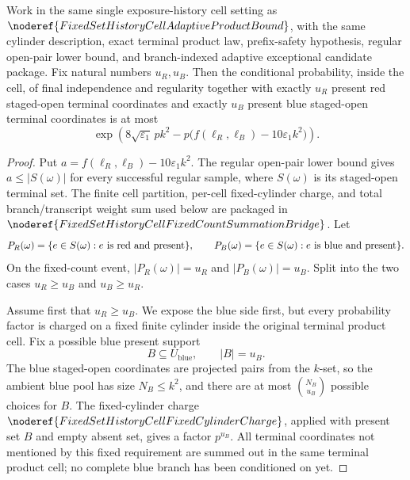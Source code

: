 \begin{helper}
Work in the same single exposure-history cell setting as
\(\noderef{FixedSetHistoryCellAdaptiveProductBound}\), with the same
cylinder description, exact terminal product law, prefix-safety hypothesis,
regular open-pair lower bound, and branch-indexed adaptive exceptional
candidate package.  Fix natural numbers \(u_R,u_B\).  Then the conditional
probability, inside the cell, of final independence and regularity together
with exactly \(u_R\) present red staged-open terminal coordinates and exactly
\(u_B\) present blue staged-open terminal coordinates is at most
\[
\exp\!\left(
8\sqrt{\varepsilon_1}\,pk^2
-p\bigl(f(\ell_R,\ell_B)-10\varepsilon_1k^2\bigr)\right).
\]
\end{helper}
\begin{proof}
Put \(a=f(\ell_R,\ell_B)-10\varepsilon_1k^2\).  The regular open-pair lower
bound gives \(a\le |S(\omega)|\) for every successful regular sample, where
\(S(\omega)\) is its staged-open terminal set.  The finite cell partition,
per-cell fixed-cylinder charge, and total branch/transcript weight sum used
below are packaged in
\(\noderef{FixedSetHistoryCellFixedCountSummationBridge}\).  Let
\[
P_R(\omega)=\{e\in S(\omega):e\hbox{ is red and present}\},
\qquad
P_B(\omega)=\{e\in S(\omega):e\hbox{ is blue and present}\}.
\]
On the fixed-count event, \(|P_R(\omega)|=u_R\) and
\(|P_B(\omega)|=u_B\).  Split into the two cases \(u_R\ge u_B\) and
\(u_B\ge u_R\).

Assume first that \(u_R\ge u_B\).  We expose the blue side first, but every
probability factor is charged on a fixed finite cylinder inside the original
terminal product cell.  Fix a possible blue present support
\[
B\subseteq U_{\mathrm{blue}},\qquad |B|=u_B .
\]
The blue staged-open coordinates are projected pairs from the \(k\)-set, so
the ambient blue pool has size \(N_B\le k^2\), and there are at most
\(\binom{N_B}{u_B}\) possible choices for \(B\).
The fixed-cylinder charge
\(\noderef{FixedSetHistoryCellFixedCylinderCharge}\), applied with present
set \(B\) and empty absent set, gives a factor \(p^{u_B}\).  All terminal
coordinates not mentioned by this fixed requirement are summed out in the
same terminal product cell; no complete blue branch has been conditioned on
yet.


\end{proof}
